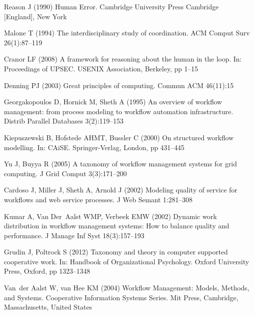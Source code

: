 \documentclass[11pt]{bmc_article_s50}
\begin{document}
\begin{thebibliography}{000}
Reason J (1990)
{Human Error}.
{Cambridge University Press Cambridge [England]},
{New York}



Malone T (1994)
{The interdisciplinary study of coordination}.
ACM Comput Surv
{26}(1):87--{119}


Cranor LF (2008)
{A framework for reasoning about the human in the loop}.
In: {Proceedings of {UPSEC}}.
{USENIX Association},
{Berkeley}, pp 1--{15}


Denning PJ (2003)
{{Great principles of computing}}.
{Commun ACM}
{46}(11):15



Georgakopoulos D,
Hornick M,
Sheth A (1995)
{An overview of workflow management: from process modeling to workflow
  automation infrastructure}.
{Distrib Parallel Databases}
{3}(2):119--{153}



Kiepuszewski B,
Hofstede AHMT,
Bussler C (2000)
{On structured workflow modelling}.
In: {CAiSE}.
{Springer-Verlag},
{London},
pp 431--{445}


Yu J,
Buyya R (2005)
{A taxonomy of workflow management systems for grid computing}.
{J Grid Comput}
{3}(3):171--{200}



Cardoso J,
Miller J,
Sheth A,
Arnold J (2002)
{Modeling quality of service for workflows and web service processes}.
{J Web Semant}
{1}:281--{308}



Kumar A,
Van Der~Aalst WMP,
Verbeek EMW (2002)
{Dynamic work distribution in workflow management systems: How to
  balance quality and performance}.
{J Manage Inf Syst}
{18}(3):157--{193}



Grudin J,
Poltrock S (2012)
{Taxonomy and theory in computer supported cooperative work}.
In: {Handbook of Organizational Psychology}.
{Oxford University Press},
{Oxford},
pp 1323--{1348}


Van~der Aalst W,
van Hee KM (2004)
{Workflow Management: Models, Methods, and Systems}.
{Cooperative Information Systems Series}.
{Mit Press},
{Cambridge, Massachusetts, United States}




\end{thebibliography}
\end{document}
